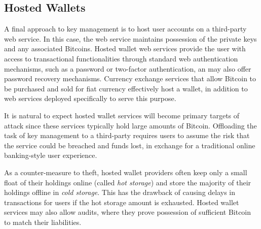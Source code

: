 \subsection{Hosted Wallets} 
A final approach to key management is to host user accounts on a third-party web service. In this case, the web service maintains possession of the private keys and any associated Bitcoins. Hosted wallet web services provide the user with access to transactional functionalities through standard web authentication mechanisms, such as a password or two-factor authentication, an may also offer password recovery mechanisms. Currency exchange services that allow Bitcoin to be purchased and sold for fiat currency effectively host a wallet, in addition to web services deployed specifically to serve this purpose.


It is natural to expect hosted wallet services will become primary targets of attack since these services typically hold large amounts of Bitcoin. Offloading the task of key management to a third-party requires users to assume the risk that the service could be breached and funds lost, in exchange for a traditional online banking-style user experience. 

As a counter-measure to theft, hosted wallet providers often keep only a small float of their holdings online (called \textit{hot storage}) and store the majority of their holdings offline in \textit{cold storage}. This has the drawback of causing delays in transactions for users if the hot storage amount is exhausted.
Hosted wallet services may also allow audits, where they prove possession of sufficient Bitcoin to match their liabilities.  

